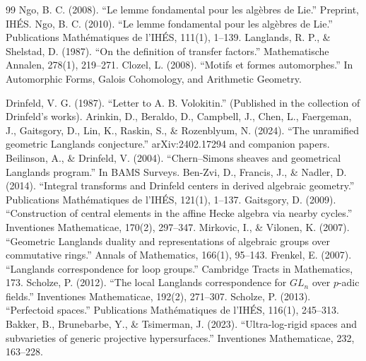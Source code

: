 \begin{thebibliography}{99}
 Ngo, B. C. (2008). ``Le lemme fondamental pour les algèbres de Lie.'' Preprint, IHÉS.
 Ngo, B. C. (2010). ``Le lemme fondamental pour les algèbres de Lie.'' Publications Mathématiques de l'IHÉS, 111(1), 1--139.
 Langlands, R. P., \& Shelstad, D. (1987). ``On the definition of transfer factors.'' Mathematische Annalen, 278(1), 219--271.
 Clozel, L. (2008). ``Motifs et formes automorphes.'' In Automorphic Forms, Galois Cohomology, and Arithmetic Geometry.

 Drinfeld, V. G. (1987). ``Letter to A. B. Volokitin.'' (Published in the collection of Drinfeld's works).
 Arinkin, D., Beraldo, D., Campbell, J., Chen, L., Faergeman, J., Gaitsgory, D., Lin, K., Raskin, S., \& Rozenblyum, N. (2024). ``The unramified geometric Langlands conjecture.'' arXiv:2402.17294 and companion papers.
 Beilinson, A., \& Drinfeld, V. (2004). ``Chern--Simons sheaves and geometrical Langlands program.'' In BAMS Surveys.
 Ben-Zvi, D., Francis, J., \& Nadler, D. (2014). ``Integral transforms and Drinfeld centers in derived algebraic geometry.'' Publications Mathématiques de l'IHÉS, 121(1), 1--137.
 Gaitsgory, D. (2009). ``Construction of central elements in the affine Hecke algebra via nearby cycles.'' Inventiones Mathematicae, 170(2), 297--347.
 Mirkovic, I., \& Vilonen, K. (2007). ``Geometric Langlands duality and representations of algebraic groups over commutative rings.'' Annals of Mathematics, 166(1), 95--143.
 Frenkel, E. (2007). ``Langlands correspondence for loop groups.'' Cambridge Tracts in Mathematics, 173.
 Scholze, P. (2012). ``The local Langlands correspondence for $GL_n$ over $p$-adic fields.'' Inventiones Mathematicae, 192(2), 271--307.
 Scholze, P. (2013). ``Perfectoid spaces.'' Publications Mathématiques de l'IHÉS, 116(1), 245--313.
 Bakker, B., Brunebarbe, Y., \& Tsimerman, J. (2023). ``Ultra-log-rigid spaces and subvarieties of generic projective hypersurfaces.'' Inventiones Mathematicae, 232, 163--228.


\end{thebibliography}
